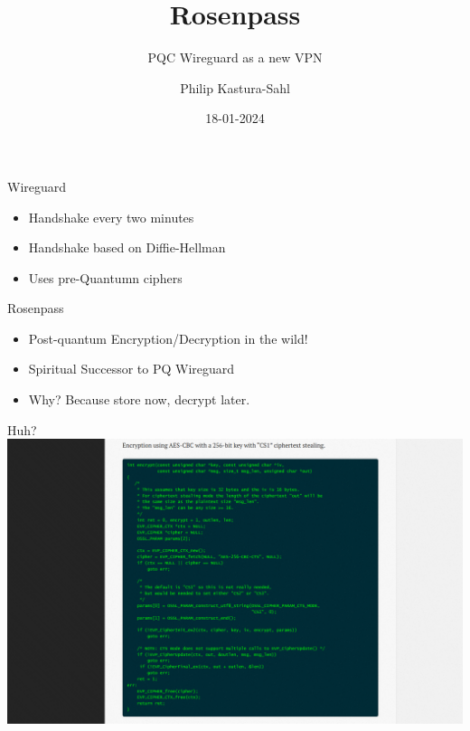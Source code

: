 \documentclass{rosenpass-beamer}
\title{Rosenpass}
\subtitle{PQC Wireguard as a new VPN}
\author{
Philip Kastura-Sahl
}
\institute{Universität Heidelberg}
\date{18-01-2024}
\begin{document}
\maketitle


\begin{frame}{Wireguard}
\begin{itemize}
  \item Handshake every two minutes
  \item Handshake based on Diffie-Hellman
  \item Uses pre-Quantumn ciphers
\end{itemize}
\end{frame}


\begin{frame}{Rosenpass}
\begin{itemize}
  \item Post-quantum Encryption/Decryption in the wild!
  \item Spiritual Successor to PQ Wireguard
  \item Why?
  Because store now, decrypt later.
\end{itemize}
\end{frame}


\begin{frame}{Huh?}
  \includegraphics[height=.9\textheight]{assets/opennssl-document.png}
\end{frame}
\end{document}
